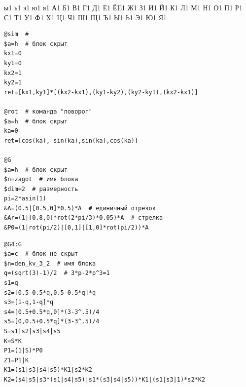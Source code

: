 \documentclass[a4paper,14pt]{extarticle} %
\newcommand{\0}{\varnothing}
\newcommand{\8}{\infty}
\theoremstyle{definition}
\begin{document}
{        {ы}{{\selectfont{}}}1
        {ь}{{\selectfont{}}}1
        {э}{{\selectfont{}}}1
        {ю}{{\selectfont{}}}1
        {я}{{\selectfont{}}}1
        {А}{{\selectfont{}}}1
        {Б}{{\selectfont{}}}1
        {В}{{\selectfont{}}}1
        {Г}{{\selectfont{}}}1
        {Д}{{\selectfont{}}}1
        {Е}{{\selectfont{}}}1
        {Ё}{{\"E}}1
        {Ж}{{\selectfont{}}}1
        {З}{{\selectfont{}}}1
        {И}{{\selectfont{}}}1
        {Й}{{\selectfont{}}}1
        {К}{{\selectfont{}}}1
        {Л}{{\selectfont{}}}1
        {М}{{\selectfont{}}}1
        {Н}{{\selectfont{}}}1
        {О}{{\selectfont{}}}1
        {П}{{\selectfont{}}}1
        {Р}{{\selectfont{}}}1
        {С}{{\selectfont{}}}1
        {Т}{{\selectfont{}}}1
        {У}{{\selectfont{}}}1
        {Ф}{{\selectfont{}}}1
        {Х}{{\selectfont{}}}1
        {Ц}{{\selectfont{}}}1
        {Ч}{{\selectfont{}}}1
        {Ш}{{\selectfont{}}}1
        {Щ}{{\selectfont{}}}1
        {Ъ}{{\selectfont{}}}1
        {Ы}{{\selectfont{}}}1
        {Ь}{{\selectfont{}}}1
        {Э}{{\selectfont{}}}1
        {Ю}{{\selectfont{}}}1
        {Я}{{\selectfont{}}}1
    }


\begin{lstlisting}[name=aifs,label=list:prev,caption=Описание команд и родительского блока]
@sim  # 
$a=h  # блок скрыт
kx1=0
ky1=0
kx2=1
ky2=1
ret=[kx1,ky1]*[(kx2-kx1),(ky1-ky2),(ky2-ky1),(kx2-kx1)]

@rot  # команда "поворот"
$a=h  # блок скрыт
ka=0
ret=[cos(ka),-sin(ka),sin(ka),cos(ka)]

@G
$a=h  # блок скрыт
$n=zagot  # имя блока
$dim=2  # размерность
pi=2*asin(1)
&A=(0.5|[0.5,0]*0.5)*A  # единичный отрезок
&Ar=(1|[0.8,0]*rot(2*pi/3)*0.05)*A  # стрелка
&P0=(1|rot(pi/2)|[0,1]|[1,0]*rot(pi/2))*A
\end{lstlisting}


\begin{lstlisting}[name=aifs,label=list:prev,caption=Код примера \ref{ex:1}]
@G4:G
$a=c  # блок не скрыт
$n=den_kv_3_2  # имя блока
q=(sqrt(3)-1)/2  # 3*p-2*p^3=1
s1=q
s2=[0.5-0.5*q,0.5-0.5*q]*q
s3=[1-q,1-q]*q
s4=[0.5+0.5*q,0]*(3-3^.5)/4
s5=[0,0.5+0.5*q]*(3-3^.5)/4
S=s1|s2|s3|s4|s5
K=S*K
P1=(1|S)*P0
Z1=P1|K
K1=(s1|s3|s4|s5)*K1|s2*K2
K2=(s4|s5|s3*(s1|s4|s5)|s1*(s3|s4|s5))*K1|(s1|s3|1)*s2*K2
\end{lstlisting}
\end{document}
